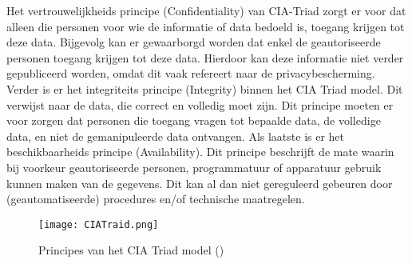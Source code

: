 \newline
Het vertrouwelijkheids principe (Confidentiality) van CIA-Triad zorgt er voor dat alleen die personen voor wie de informatie of data bedoeld is, toegang krijgen tot deze data. Bijgevolg kan er gewaarborgd worden dat enkel de geautoriseerde personen toegang krijgen tot deze data. Hierdoor kan deze informatie niet verder gepubliceerd worden, omdat dit vaak refereert naar de privacybescherming. 
\newline
Verder is er het integriteits principe (Integrity) binnen het CIA Triad model. Dit verwijst naar de data, die correct en volledig moet zijn. Dit principe moeten er voor zorgen dat personen die toegang vragen tot bepaalde data, de volledige data, en niet de gemanipuleerde data ontvangen. 
\newpage
{}
\newline
Als laatste is er het beschikbaarheids principe (Availability). Dit principe beschrijft de mate waarin bij voorkeur geautoriseerde personen, programmatuur of apparatuur gebruik kunnen maken van de gegevens. Dit kan al dan niet gereguleerd gebeuren door (geautomatiseerde) procedures en/of technische maatregelen. 

\begin{figure}[H]
	\centering
	\texttt{[image: CIATraid.png]}
	\caption{Principes van het CIA Triad model (\cite{PrincipesCIA})}
	\label{fig:CIATraid}
\end{figure}

